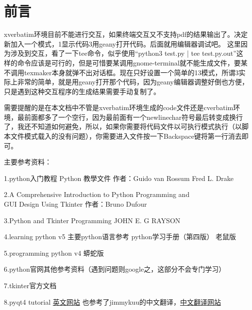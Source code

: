 \documentclass[12pt,oneside]{book}
\begin{document}
\frontmatter

\author{万泽}
\titleLB

\chapter*{前言}
\begin{common-format}
xverbatim环境目前不能进行交互，如果终端交互又不支持pdf的结果输出了。决定新加入一个模式，1显示代码3用geany打开代码。后面就用编辑器调试吧。
这里因为涉及到交互，看了一下tee命令，似乎使用“python3 test.py | tee test.py.out”这样的命令应该是可行的，但是可惜要某调用gnome-terminal就不能生成文件，要某不调用texmaker本身就弹不出对话框。现在只好设置一个简单的13模式，所谓3实际上非常的简单，就是用geany打开那个代码，因为geany编辑器调整好倒也方便，只是遇到这种交互程序的生成结果需要手动复制了。


需要提醒的是在本文档中不管是xverbatim环境生成的code文件还是cverbatim环境，最前面都多了一个空行，因为最前面有一个newlinechar符号最后转变成换行了，我还不知道如何避免，所以，如果你需要将代码文件以可执行模式执行（以脚本文件模式载入的没有问题），你需要进入文件按一下Backspace键将第一行消去即可。

主要参考资料：

1.python入门教程 Python 教學文件 作者：Guido van Rossum  Fred L. Drake

2.A Comprehensive Introduction to Python Programming and\\ GUI Design Using Tkinter 作者：Bruno Dufour

3.Python and Tkinter Programming  JOHN E. G RAYSON

4.learning python v5  主要python语言参考   python学习手册（第四版） 老鼠版

5.programming python v4 蟒蛇版

6.python官网其他参考资料（遇到问题则google之，这部分不会专门学习）

7.tkinter官方文档

8.pyqt4 tutorial \href{http://zetcode.com/gui/pyqt4/}{英文网站} 也参考了jimmykuu的中文翻译，\href{http://blog.cx125.com/books/PyQt4_Tutorial/}{中文翻译网站}




\end{common-format}


\setcounter{tocdepth}{2}
\tableofcontents
\end{document}

